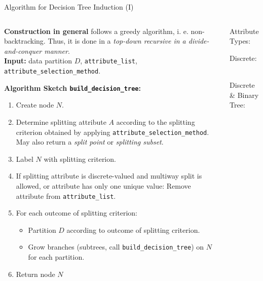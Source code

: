 \begin{frame}{Algorithm for Decision Tree Induction (I)}
	\vspace*{-1em}
	\begin{columns}
		\begin{column}{0.75\textwidth}
			\textbf{Construction in general} follows a greedy algorithm, i. e. non-backtracking. Thus, it is done in a \textit{top-down recursive in a divide-and-conquer manner}.\\\medskip
			\textbf{Input:} data partition $D$, \texttt{attribute\_list}, \texttt{attribute\_selection\_method}.\\\medskip

			\textbf{Algorithm Sketch \texttt{build\_decision\_tree}:}
			\footnotesize
			\begin{enumerate}
				\item Create node $N$.
				\item Determine splitting attribute $A$ according to the splitting criterion
				      obtained by applying \texttt{attribute\_selection\_method}.  May also return a \textit{split point} or \textit{splitting subset}.
				\item Label $N$ with splitting criterion.
				\item If splitting attribute is discrete-valued and multiway split is allowed, or attribute has only one unique value: Remove attribute from \texttt{attribute\_list}.
				\item For each outcome of splitting criterion:
				      \begin{itemize}
					      \footnotesize
					      \item Partition $D$ according to outcome of splitting criterion.
					      \item Grow branches (subtrees, call \texttt{build\_decision\_tree}) on $N$ for each partition.
				      \end{itemize}
				\item Return node $N$
			\end{enumerate}


		\end{column}
		\begin{column}{0.25\textwidth}
			\vspace*{-3em}
			\centering

			Attribute Types:
			\small

			Discrete:
			\begin{figure}[t]
				\centering
				
			\end{figure}
			~ \\\bigskip
			Discrete \& Binary Tree:
			\begin{figure}[t]
				\centering
				
			\end{figure}


\end{column}
\end{columns}
\end{frame}
